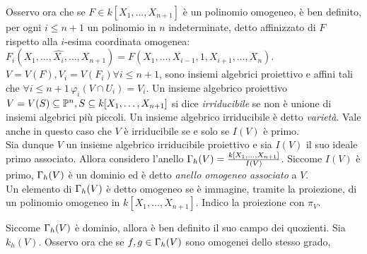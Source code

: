         Osservo ora che se $F \in k[X_1,\ldots,X_{n+1}]$ è un polinomio omogeneo, è ben definito, per ogni $i \leq n+1$ un polinomio in $n$ indeterminate, 
        detto affinizzato di $F$ rispetto alla $i$-esima coordinata omogenea: $F_i(X_1,\ldots,\hat{X_i},\ldots,X_{n+1}) = F(X_1,\ldots,X_{i-1},1,X_{i+1},\ldots,X_n)$. 
        $V = V(F), V_i = V(F_i) \forall i \leq n+1$, sono insiemi algebrici proiettivo e affini tali che $\forall i \leq n+1 \, \varphi_i(V \cap U_i) = V_i$.
        Un insieme algebrico proiettivo $V = V(S) \subseteq \P^n, S \subseteq k[X_1,\ldots,X_{n+1}]$ si dice \emph{irriducibile} se non è unione di insiemi algebrici più piccoli. Un 
        insieme algebrico irriducibile è detto \emph{varietà}. Vale anche in questo caso che $V$ è irriducibile se e solo se $I(V)$ è primo.\\
        Sia dunque $V$ un insieme algebrico irriducibile proiettivo e sia $I(V)$ il suo ideale primo associato. Allora considero l'anello $\gG_h(V) = 
        \frac{k[X_1,\ldots,X_{n+1}]}{I(V)}$. Siccome $I(V)$ è primo, $\gG_h(V)$ è un dominio ed è detto \emph{anello omogeneo associato} a $V$.\\
        Un elemento di $\gG_h(V)$ è detto omogeneo se è immagine, tramite la proiezione, di un polinomio omogeneo in $k[X_1,\ldots,X_{n+1}]$. Indico la proiezione con $\pi_V$.
        \begin{comment}
        \begin{proposizione}
            Ogni elemento $f \in \gG_h(V)$ si può scrivere in modo univoco come somma di omogenei tali che: $f = \sum_{i=0}^m f_i, f_i$ omogeneo di grado $i$.
        \end{proposizione}
        \begin{proof}
            Sia $F \in k[X_1,\ldots,X_{n+1}]$, tale che $\pi(F) = f$, allora, $F = \sum_{i=0}^m F_i, F_i$ polinomio omogeneo di grado $i$. Dunque $f = \pi(F) = \pi(\sum_{i=0}^m
            F_i) = \sum_{i=0}^m \pi(F_i) = \sum_{i=0}^m f_i$.\\
            Per quanto riguarda l'unicità siano $f = \sum_{i=0}^m g_i, g_i$ omogeneo di grado $i$. Allora, esistono $G_i \in k[X_1,\ldots,X_{n+1}],G_i$ polinomio omogeneo di grado 
            $i$ per ogni $i$, tali che $\pi(G_i) = g_i$ per ogni $i$, allora $F - \sum_{i=0}^m G_i = \sum_{i=0}^m F_i - G_i \in I(V)$ perché $\pi(F-\sum_{i=0}^m G_i) = 0$. Dunque, 
            $f_i = g_i$ per ogni $i$.  
        \end{proof}
        \end{comment}
        Siccome $\gG_h(V)$ è dominio, allora è ben definito il suo campo dei quozienti. Sia $k_h(V)$. Osservo ora che se $f,g \in \gG_h(V)$ sono omogenei dello stesso grado, 
